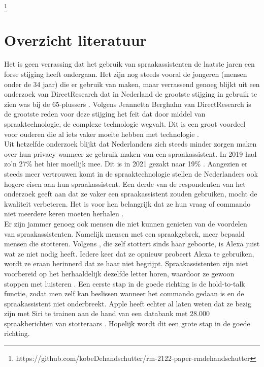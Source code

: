 \documentclass{hogent-article}
\begin{document}
\footnote{https://github.com/kobeDehandschutter/rm-2122-paper-rmdehandschutter}
\section{Overzicht literatuur}




Het is geen verrassing dat het gebruik van spraakassistenten de laatste jaren een forse stijging heeft ondergaan. Het zijn nog steeds vooral de jongeren (mensen onder de 34 jaar) die er gebruik van maken, maar verrassend genoeg blijkt uit een onderzoek van DirectResearch dat in Nederland de grootste stijging in gebruik te zien was bij de 65-plussers \autocite{Molkenboer2022}.
Volgens Jeannetta Berghahn van DirectResearch is de grootste reden voor deze stijging het feit dat door middel van spraaktechnologie, de complexe technologie wegvalt. Dit is een groot voordeel voor ouderen die al iets vaker moeite hebben met technologie \autocite{Molkenboer2022}.
\\\indent
Uit hetzelfde onderzoek blijkt dat Nederlanders zich steeds minder zorgen maken over hun privacy wanneer ze gebruik maken van een spraakassistent. In 2019 had zo'n 27\% het hier moeilijk mee. Dit is in 2021 gezakt naar 19\% \autocite{Molkenboer2022}. Aangezien er steeds meer vertrouwen komt in de spraaktechnologie stellen de Nederlanders ook hogere eisen aan hun spraakassistent. Een derde van de respondenten van het onderzoek geeft aan dat ze vaker een spraakassistent zouden gebruiken, mocht de kwaliteit verbeteren. Het is voor hen belangrijk dat ze hun vraag of commando niet meerdere keren moeten herhalen \autocite{Molkenboer2022}.
\\\indent
Er zijn jammer genoeg ook mensen die niet kunnen genieten van de voordelen van spraakassistenten. Namelijk mensen met een spraakgebrek, meer bepaald mensen die stotteren. Volgens \textcite{Fitzpatrick2020}, die zelf stottert sinds haar geboorte, is Alexa juist wat ze niet nodig heeft. Iedere keer dat ze opnieuw probeert Alexa te gebruiken, wordt ze eraan herinnerd dat ze haar niet begrijpt. Spraakassistenten zijn niet voorbereid op het herhaaldelijk dezelfde letter horen, waardoor ze gewoon stoppen met luisteren \autocite{Fitzpatrick2020}. Een eerste stap in de goede richting is de hold-to-talk functie, zodat men zelf kan beslissen wanneer het commando gedaan is en de spraakassistent niet onderbreekt. Apple heeft echter al laten weten dat ze bezig zijn met Siri te trainen aan de hand van een databank met 28.000 spraakberichten van stotteraars \autocite{Dormehl2021}. Hopelijk wordt dit een grote stap in de goede richting.
\end{document}
